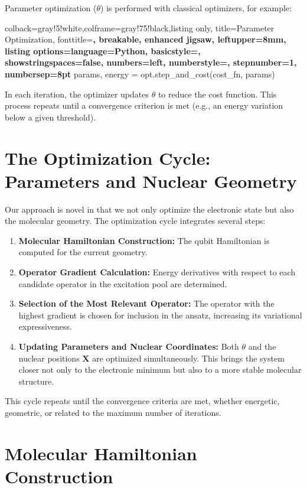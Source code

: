Parameter optimization (\(\theta\)) is performed with classical optimizers, for example:

\begin{tcblisting}{colback=gray!5!white,colframe=gray!75!black,listing only,
    title=Parameter Optimization, fonttitle=\bfseries, breakable, enhanced jigsaw, leftupper=8mm,
    listing options={language=Python, basicstyle=\ttfamily\small,
    showstringspaces=false, numbers=left, numberstyle=\footnotesize, stepnumber=1, numbersep=8pt}}
params, energy = opt.step_and_cost(cost_fn, params)
\end{tcblisting}

In each iteration, the optimizer updates \(\theta\) to reduce the cost function. This process repeats until a convergence criterion is met (e.g., an energy variation below a given threshold).

\section{The Optimization Cycle: Parameters and Nuclear Geometry}

Our approach is novel in that we not only optimize the electronic state but also the molecular geometry. The optimization cycle integrates several steps:

\begin{enumerate}
    \item \textbf{Molecular Hamiltonian Construction:} The qubit Hamiltonian is computed for the current geometry.
    \item \textbf{Operator Gradient Calculation:} Energy derivatives with respect to each candidate operator in the excitation pool are determined.
    \item \textbf{Selection of the Most Relevant Operator:} The operator with the highest gradient is chosen for inclusion in the ansatz, increasing its variational expressiveness.
    \item \textbf{Updating Parameters and Nuclear Coordinates:} Both \(\theta\) and the nuclear positions \(\mathbf{X}\) are optimized simultaneously. This brings the system closer not only to the electronic minimum but also to a more stable molecular structure.
\end{enumerate}

This cycle repeats until the convergence criteria are met, whether energetic, geometric, or related to the maximum number of iterations.

\section{Molecular Hamiltonian Construction}

